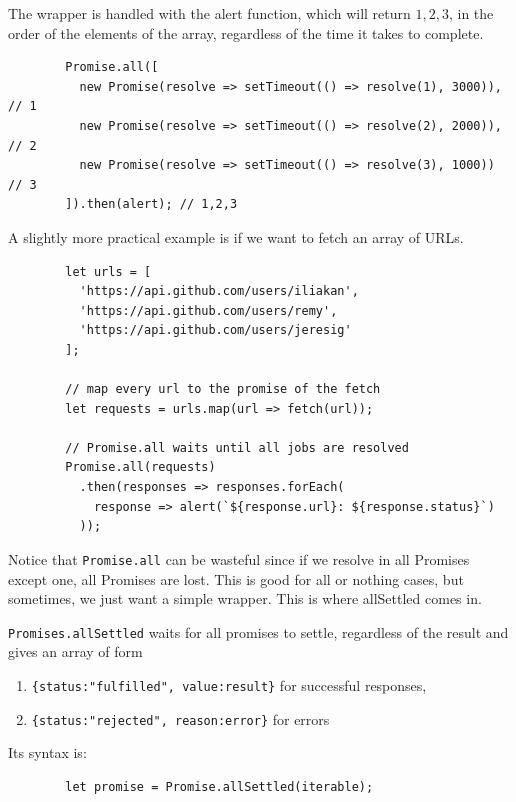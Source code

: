 \documentclass{article}
\newcounter{definition}[section]
\newcounter{example}[section]
\begin{document}
    \begin{example}
      \label{ex:alert-wrapper-return-values}
      The wrapper is handled with the alert function, which will return $1, 2, 3$, in the order of the elements of the array, regardless of the time it takes to complete. 
      
      \begin{lstlisting}
        Promise.all([
          new Promise(resolve => setTimeout(() => resolve(1), 3000)), // 1
          new Promise(resolve => setTimeout(() => resolve(2), 2000)), // 2
          new Promise(resolve => setTimeout(() => resolve(3), 1000))  // 3
        ]).then(alert); // 1,2,3  
      \end{lstlisting}

      A slightly more practical example is if we want to fetch an array of URLs. 

      \begin{lstlisting}
        let urls = [
          'https://api.github.com/users/iliakan',
          'https://api.github.com/users/remy',
          'https://api.github.com/users/jeresig'
        ];

        // map every url to the promise of the fetch
        let requests = urls.map(url => fetch(url));

        // Promise.all waits until all jobs are resolved
        Promise.all(requests)
          .then(responses => responses.forEach(
            response => alert(`${response.url}: ${response.status}`)
          )); 
      \end{lstlisting}
    \end{example}

    Notice that \texttt{Promise.all} can be wasteful since if we resolve in all Promises except one, all Promises are lost. This is good for all or nothing cases, but sometimes, we just want a simple wrapper. This is where allSettled comes in. 

    \begin{definition}
      \label{def:promises-allsettled}
      \texttt{Promises.allSettled} waits for all promises to settle, regardless of the result and gives an array of form 
      \begin{enumerate}
        \item \texttt{\{status:"fulfilled", value:result\}} for successful responses, 
        \item \texttt{\{status:"rejected", reason:error\}} for errors
      \end{enumerate}
      Its syntax is: 
      \begin{lstlisting}
        let promise = Promise.allSettled(iterable); 
      \end{lstlisting}
    \end{definition}
\end{document}
